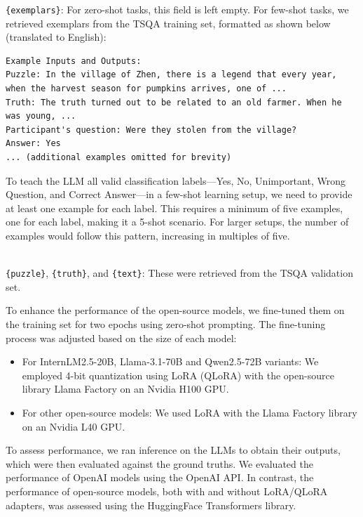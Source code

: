 \documentclass[conference]{IEEEtran}
\begin{document}
    \texttt{\{exemplars\}}: For zero-shot tasks, this field is left empty. For few-shot tasks, we retrieved exemplars from the TSQA training set, formatted as shown below (translated to English):
\small{
\begin{verbatim}
Example Inputs and Outputs:
Puzzle: In the village of Zhen, there is a legend that every year, when the harvest season for pumpkins arrives, one of ... 
Truth: The truth turned out to be related to an old farmer. When he was young, ...
Participant's question: Were they stolen from the village?
Answer: Yes
... (additional examples omitted for brevity)
\end{verbatim}

To teach the LLM all valid classification labels—Yes, No, Unimportant, Wrong Question, and Correct Answer—in a few-shot learning setup, we need to provide at least one example for each label. This requires a minimum of five examples, one for each label, making it a 5-shot scenario. For larger setups, the number of examples would follow this pattern, increasing in multiples of five.
}\\
    \texttt{\{puzzle\}}, \texttt{\{truth\}}, and \texttt{\{text\}}: These were retrieved from the TSQA validation set.

To enhance the performance of the open-source models, we fine-tuned them on the training set for two epochs using zero-shot prompting. The fine-tuning process was adjusted based on the size of each model:

\begin{itemize}
    \item For InternLM2.5-20B, Llama-3.1-70B and Qwen2.5-72B variants: We employed 4-bit quantization using LoRA (QLoRA) with the open-source library Llama Factory \cite{zheng2024llamafactory} on an Nvidia H100 GPU.
    \item For other open-source models: We used LoRA with the Llama Factory library on an Nvidia L40 GPU.
\end{itemize}

To assess performance, we ran inference on the LLMs to obtain their outputs, which were then evaluated against the ground truths. We evaluated the performance of OpenAI models using the OpenAI API.
In contrast, the performance of open-source models, both with and without LoRA/QLoRA adapters, was assessed using the HuggingFace Transformers library\cite{wolf2020transformers}.
\end{document}
